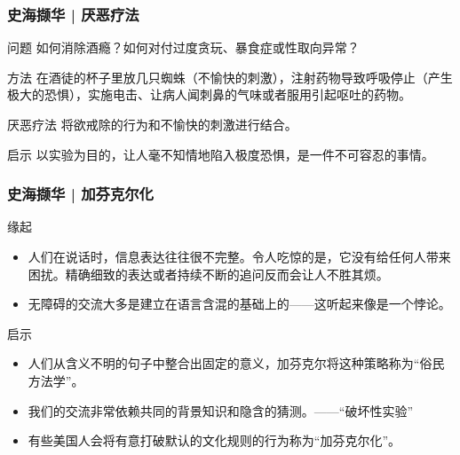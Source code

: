 \begin{frame}
  \frametitle{史海撷华 | 厌恶疗法}
  \begin{block}{问题}
    如何消除酒瘾？如何对付过度贪玩、暴食症或性取向异常？
  \end{block}
  \pause
  \begin{block}{方法}
在酒徒的杯子里放几只蜘蛛（不愉快的刺激），注射药物导致呼吸停止（产生极大的恐惧），实施电击、让病人闻刺鼻的气味或者服用引起呕吐的药物。
  \end{block}
  \pause
  \begin{block}{厌恶疗法}
    将欲戒除的行为和不愉快的刺激进行结合。
  \end{block}
  \pause
  \begin{block}{启示}
    以实验为目的，让人毫不知情地陷入极度恐惧，是一件不可容忍的事情。
  \end{block}
\end{frame}

\begin{frame}
  \frametitle{史海撷华 | 加芬克尔化}
  \begin{block}{缘起}
    \begin{itemize}
      \item 人们在说话时，信息表达往往很不完整。令人吃惊的是，它没有给任何人带来困扰。精确细致的表达或者持续不断的追问反而会让人不胜其烦。
      \item 无障碍的交流大多是建立在语言含混的基础上的——这听起来像是一个悖论。
    \end{itemize}
  \end{block}
  \pause
  \begin{block}{启示}
    \begin{itemize}
      \item 人们从含义不明的句子中整合出固定的意义，加芬克尔将这种策略称为“俗民方法学”。
      \item 我们的交流非常依赖共同的背景知识和隐含的猜测。——“破坏性实验”
      \item 有些美国人会将有意打破默认的文化规则的行为称为“加芬克尔化”。
    \end{itemize}
  \end{block}
\end{frame}

